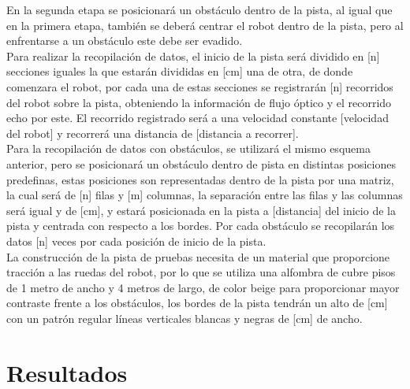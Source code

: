 \documentclass{iccmemoria}
\begin{document}
En la segunda etapa se posicionará un obstáculo dentro de la pista, al igual que en la primera etapa, también se deberá centrar el robot dentro de la pista, pero al enfrentarse a un obstáculo este debe ser evadido.\\

Para realizar la recopilación de datos, el inicio de la pista será dividido en [n] secciones iguales la que estarán divididas en [cm] una de otra, de donde comenzara el robot, por cada una de estas secciones se registrarán [n] recorridos del robot sobre la pista, obteniendo la información de flujo óptico y el recorrido echo por este. El recorrido registrado será a una velocidad constante [velocidad del robot] y recorrerá una distancia de [distancia a recorrer].\\

Para la recopilación de datos con obstáculos, se utilizará el mismo esquema anterior, pero se posicionará un obstáculo dentro de pista en distintas posiciones predefinas, estas posiciones son representadas dentro de la pista por una matriz, la cual será de [n] filas y [m] columnas, la separación entre las filas y las columnas será igual y de [cm], y estará posicionada en la pista a [distancia] del inicio de la pista y centrada con respecto a los bordes. Por cada obstáculo se recopilarán los datos [n] veces por cada posición de inicio de la pista.\\

La construcción de la pista de pruebas necesita de un material que proporcione tracción a las ruedas del robot, por lo que se utiliza una alfombra de cubre pisos de 1 metro de ancho y 4 metros de largo, de color beige para proporcionar mayor contraste frente a los obstáculos, los bordes de la pista tendrán un alto de [cm] con un patrón regular líneas verticales blancas y negras de [cm] de ancho.

\chapter{Resultados}
\end{document}
